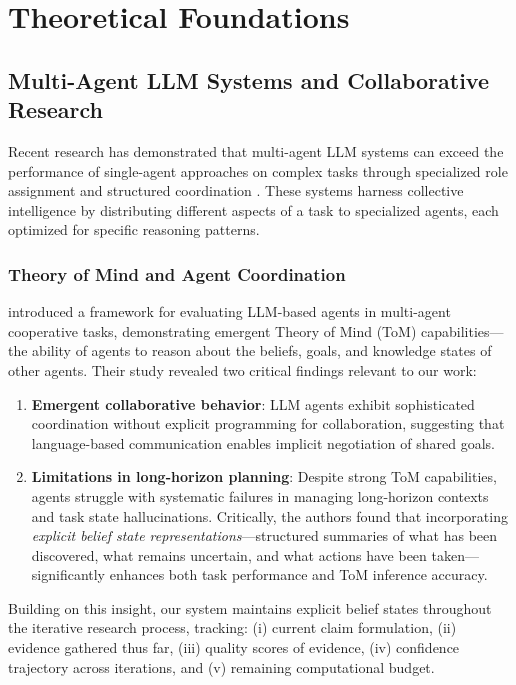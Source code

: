 \section{Theoretical Foundations}

\subsection{Multi-Agent LLM Systems and Collaborative Research}

Recent research has demonstrated that multi-agent LLM systems can exceed the performance of single-agent approaches on complex tasks through specialized role assignment and structured coordination \citep{multiagent_collaboration_survey2025, li2023theory}. These systems harness collective intelligence by distributing different aspects of a task to specialized agents, each optimized for specific reasoning patterns.

\subsubsection{Theory of Mind and Agent Coordination}

\citet{li2023theory} introduced a framework for evaluating LLM-based agents in multi-agent cooperative tasks, demonstrating emergent Theory of Mind (ToM) capabilities—the ability of agents to reason about the beliefs, goals, and knowledge states of other agents. Their study revealed two critical findings relevant to our work:

\begin{enumerate}
    \item \textbf{Emergent collaborative behavior}: LLM agents exhibit sophisticated coordination without explicit programming for collaboration, suggesting that language-based communication enables implicit negotiation of shared goals.
    
    \item \textbf{Limitations in long-horizon planning}: Despite strong ToM capabilities, agents struggle with systematic failures in managing long-horizon contexts and task state hallucinations. Critically, the authors found that incorporating \textit{explicit belief state representations}—structured summaries of what has been discovered, what remains uncertain, and what actions have been taken—significantly enhances both task performance and ToM inference accuracy.
\end{enumerate}

Building on this insight, our system maintains explicit belief states throughout the iterative research process, tracking: (i) current claim formulation, (ii) evidence gathered thus far, (iii) quality scores of evidence, (iv) confidence trajectory across iterations, and (v) remaining computational budget.

